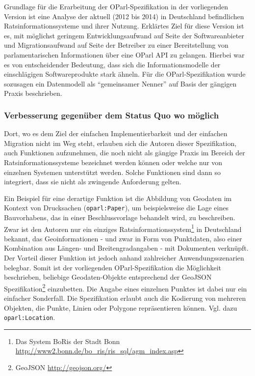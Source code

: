 \documentclass[,a4paper]{article}
\begin{document}
Grundlage für die Erarbeitung der OParl-Spezifikation in der
vorliegenden Version ist eine Analyse der aktuell (2012 bis 2014) in
Deutschland befindlichen Ratsinformationssysteme und ihrer Nutzung.
Erklärtes Ziel für diese Version ist es, mit möglichst geringem
Entwicklungsaufwand auf Seite der Softwareanbieter und Migrationsaufwand
auf Seite der Betreiber zu einer Bereitstellung von parlamentarischen
Informationen über eine OParl API zu gelangen. Hierbei war es von
entscheidender Bedeutung, dass sich die Informationsmodelle der
einschlägigen Softwareprodukte stark ähneln. Für die OParl-Spezifikation
wurde sozusagen ein Datenmodell als ``gemeinsamer Nenner'' auf Basis der
gängigen Praxis beschrieben.

\subsubsection{Verbesserung gegenüber dem Status Quo wo
möglich}\label{verbesserung-gegenuxfcber-dem-status-quo-wo-muxf6glich}

Dort, wo es dem Ziel der einfachen Implementierbarkeit und der einfachen
Migration nicht im Weg steht, erlauben sich die Autoren dieser
Spezifikation, auch Funktionen aufzunehmen, die noch nicht als gängige
Praxis im Bereich der Ratsinformationssysteme bezeichnet werden können
oder welche nur von einzelnen Systemen unterstützt werden. Solche
Funktionen sind dann so integriert, dass sie nicht als zwingende
Anforderung gelten.

Ein Beispiel für eine derartige Funktion ist die Abbildung von Geodaten
im Kontext von Drucksachen (\texttt{oparl:Paper}), um beispielsweise die
Lage eines Bauvorhabens, das in einer Beschlussvorlage behandelt wird,
zu beschreiben. Zwar ist den Autoren nur ein einziges
Ratsinformationssystem\footnote{Das System BoRis der Stadt Bonn
  \url{http://www2.bonn.de/bo_ris/ris_sql/agm_index.asp}} in Deutschland
bekannt, das Geoinformationen - und zwar in Form von Punktdaten, also
einer Kombination aus Längen- und Breitengradangaben - mit Dokumenten
verknüpft. Der Vorteil dieser Funktion ist jedoch anhand zahlreicher
Anwendungsszenarien belegbar. Somit ist der vorliegenden
OParl-Spezifikation die Möglichkeit beschrieben, beliebige
Geodaten-Objekte entsprechend der GeoJSON Spezifikation\footnote{GeoJSON
  \url{http://geojson.org/}} einzubetten. Die Angabe eines einzelnen
Punktes ist dabei nur ein einfacher Sonderfall. Die Spezifikation
erlaubt auch die Kodierung von mehreren Objekten, die Punkte, Linien
oder Polygone repräsentieren können. Vgl. dazu \texttt{oparl:Location}.
\end{document}
